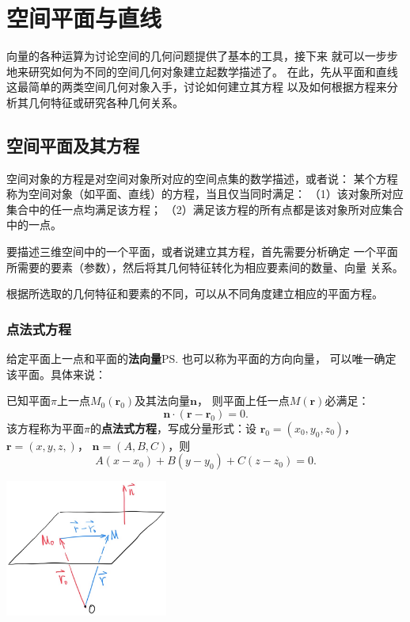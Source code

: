 \section{空间平面与直线}

向量的各种运算为讨论空间的几何问题提供了基本的工具，接下来
就可以一步步地来研究如何为不同的空间几何对象建立起数学描述了。
在此，先从平面和直线这最简单的两类空间几何对象入手，讨论如何建立其方程
以及如何根据方程来分析其几何特征或研究各种几何关系。

\subsection{空间平面及其方程}

空间对象的方程是对空间对象所对应的空间点集的数学描述，或者说：
某个方程称为空间对象（如平面、直线）的方程，当且仅当同时满足：
（1）该对象所对应集合中的任一点均满足该方程；
（2）满足该方程的所有点都是该对象所对应集合中的一点。

要描述三维空间中的一个平面，或者说建立其方程，首先需要分析确定
一个平面所需要的要素（参数），然后将其几何特征转化为相应要素间的数量、向量
关系。

根据所选取的几何特征和要素的不同，可以从不同角度建立相应的平面方程。

\subsubsection{点法式方程}

给定平面上一点和平面的{\bf 法向量}\ps{也可以称为平面的方向向量}，
可以唯一确定该平面。具体来说：

\begin{thx}
	已知平面$\pi$上一点$M_0(\bm{r}_0)$及其法向量$\bm{n}$，
	则平面上任一点$M(\bm{r})$必满足： 
	$$\bm{n}\cdot(\bm{r}-\bm{r}_0)=0.$$
	该方程称为平面$\pi$的{\bf 点法式方程}，写成分量形式：设
	$\bm{r}_0=(x_0,y_0,z_0)$，$\bm{r}=(x,y,z,)$，
	$\bm{n}=(A,B,C)$，则 
	$$A(x-x_0)+B(y-y_0)+C(z-z_0)=0.$$
\end{thx}

\begin{center}
	\includegraphics[width=0.4\textwidth]{./images/ch8/pnr.jpg}
\end{center}

